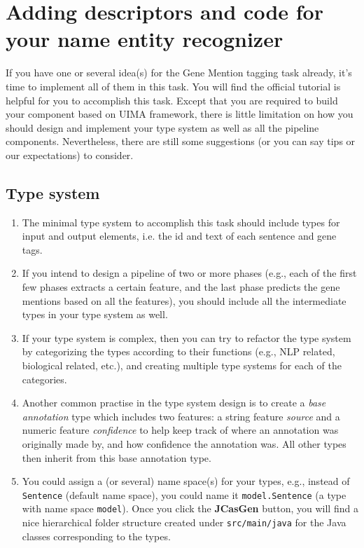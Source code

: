 
\section{Adding descriptors and code for your name entity recognizer}

If you have one or several idea(s) for the Gene Mention tagging task already,
it's time to implement all of them in this task. You will find the official
tutorial is helpful for you to accomplish this task. Except that you are
required to build your component based on UIMA framework, there is little
limitation on how you should design and implement your type system as well as
all the pipeline components. Nevertheless, there are still some suggestions (or
you can say tips or our expectations) to consider.

\subsection{Type system}

\begin{enumerate}

\item The minimal type system to accomplish this task should include types for
input and output elements, i.e. the id and text of each sentence and gene tags.

\item If you intend to design a pipeline of two or more phases (e.g., each of
the first few phases extracts a certain feature, and the last phase predicts the
gene mentions based on all the features), you should include all the
intermediate types in your type system as well.

\item If your type system is complex, then you can try to refactor the type
system by categorizing the types according to their functions (e.g., NLP
related, biological related, etc.), and creating multiple type systems for each
of the categories.

\item Another common practise in the type system design is to create a
\emph{base annotation} type which includes two features: a string feature
\emph{source} and a numeric feature \emph{confidence} to help keep track of
where an annotation was originally made by, and how confidence the annotation
was. All other types then inherit from this base annotation type.

\item You could assign a (or several) name space(s) for your types, e.g., instead
of \texttt{Sentence} (default name space), you could name it
\texttt{model.Sentence} (a type with name space \texttt{model}). Once you click
the \textbf{JCasGen} button, you will find a nice hierarchical folder structure
created under \texttt{src/main/java} for the Java classes corresponding to the
types.

\end{enumerate}

